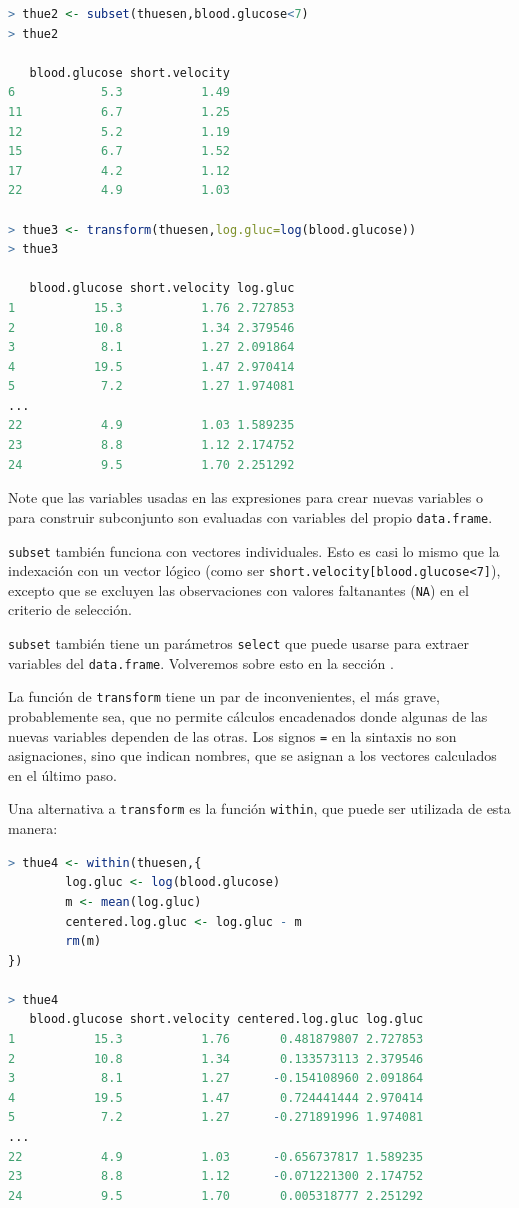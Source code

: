 \begin{lstlisting}[language=R]
> thue2 <- subset(thuesen,blood.glucose<7)
> thue2

   blood.glucose short.velocity
6            5.3           1.49
11           6.7           1.25
12           5.2           1.19
15           6.7           1.52
17           4.2           1.12
22           4.9           1.03

> thue3 <- transform(thuesen,log.gluc=log(blood.glucose))
> thue3 

   blood.glucose short.velocity log.gluc
1           15.3           1.76 2.727853
2           10.8           1.34 2.379546
3            8.1           1.27 2.091864
4           19.5           1.47 2.970414
5            7.2           1.27 1.974081
...
22           4.9           1.03 1.589235
23           8.8           1.12 2.174752
24           9.5           1.70 2.251292
\end{lstlisting}

Note que las variables usadas en las expresiones para crear nuevas variables o
para construir subconjunto son evaluadas con variables del propio
\texttt{data.frame}.

\texttt{subset} también funciona con vectores individuales. Esto es casi lo
mismo que la indexación con un vector lógico (como ser
\texttt{short.velocity[blood.glucose<7]}), excepto que se excluyen las
observaciones con valores faltanantes (\texttt{NA}) en el criterio de
selección.

\texttt{subset} también tiene un parámetros \texttt{select} que puede usarse
para extraer variables del \texttt{data.frame}. Volveremos sobre esto en la
sección \label{appending frames}.

La función de \texttt{transform} tiene un par de inconvenientes, el más grave,
probablemente sea, que no permite cálculos encadenados donde algunas de las
nuevas variables dependen de las otras. Los signos \texttt{=} en la sintaxis no
son asignaciones, sino que indican nombres, que se asignan a los vectores
calculados en el último paso.

Una alternativa a \texttt{transform} es la función \texttt{within}, que puede
ser utilizada de esta manera:

\begin{lstlisting}[language=R]
> thue4 <- within(thuesen,{
        log.gluc <- log(blood.glucose)
        m <- mean(log.gluc)
        centered.log.gluc <- log.gluc - m
        rm(m)
})

> thue4
   blood.glucose short.velocity centered.log.gluc log.gluc
1           15.3           1.76       0.481879807 2.727853
2           10.8           1.34       0.133573113 2.379546
3            8.1           1.27      -0.154108960 2.091864
4           19.5           1.47       0.724441444 2.970414
5            7.2           1.27      -0.271891996 1.974081
...
22           4.9           1.03      -0.656737817 1.589235
23           8.8           1.12      -0.071221300 2.174752
24           9.5           1.70       0.005318777 2.251292
\end{lstlisting}

